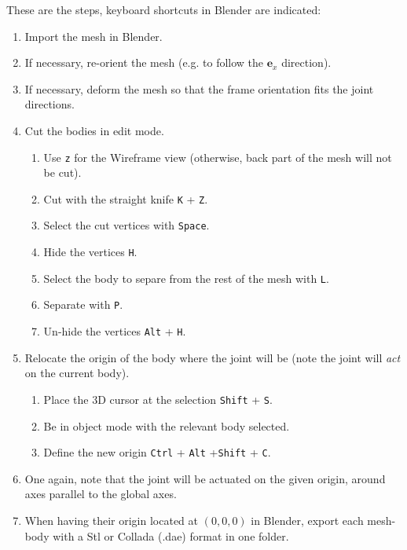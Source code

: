 \documentclass[12pt]{article}
\newcommand\e{\mathbf{e}}
\begin{document}
\noindent
These are the steps, keyboard shortcuts in Blender are indicated:
\begin{enumerate}
	\item Import the mesh in Blender.
	\item If necessary, re-orient the mesh (e.g. to follow the $\e_x$ direction).
	\item If necessary, deform the mesh so that the frame orientation fits the joint directions.
	\item Cut the bodies in edit mode.
	\begin{enumerate}
		\item Use \texttt{z} for the Wireframe view (otherwise, back part of the mesh will not be cut).
		\item Cut with the straight knife \texttt{K} + \texttt{Z}.
		\item Select the cut vertices with \texttt{Space}.
		\item Hide the vertices \texttt{H}.
		\item Select the body to separe from the rest of the mesh with \texttt{L}.
		\item Separate with \texttt{P}.
		\item Un-hide the vertices \texttt{Alt} + \texttt{H}.
	\end{enumerate}
	\item Relocate the origin of the body where the joint will be (note the joint will \textit{act} on the current body).
	\begin{enumerate}
		\item Place the 3D cursor at the selection \texttt{Shift} + \texttt{S}.
		\item Be in object mode with the relevant body selected.
		\item Define the new origin \texttt{Ctrl} + \texttt{Alt} +\texttt{Shift} + \texttt{C}.
	\end{enumerate}
	\item One again, note that the joint will be actuated on the given origin, around axes parallel to the global axes.
	\item When having their origin located at $(0,0,0)$ in Blender, export each mesh-body with a Stl or Collada (.dae) format in one folder.
\end{enumerate}
\end{document}
